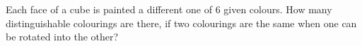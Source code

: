 Each face of a cube is painted a different one of $6$ given colours. How many distinguishable colourings are there, if two colourings are the same when one can be rotated into the other?
